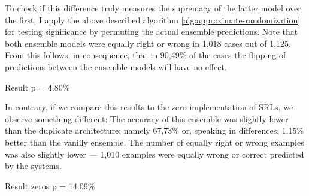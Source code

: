 To check if this difference truly measures the supremacy of the latter model over the first, I
apply the above described algorithm \ref{alg:approximate-randomization} for testing significance
by permuting the actual ensemble predictions. Note that both ensemble models were equally
right or wrong in 1,018 cases out of 1,125.  From this follows, in consequence, that in 90,49\%
of the cases the flipping of predictions between the ensemble models will have no effect.

Result p = 4.80\%

In contrary, if we compare this results to the zero implementation of SRLs, we observe something
different: The accuracy of this ensemble was slightly lower than the duplicate architecture;
namely 67,73\% or, speaking in differences, 1.15\% better than the vanilly ensemble. The
number of equally right or wrong examples was also slightly lower --- 1,010 examples were
equally wrong or correct predicted by the systems.

Result zeros p = 14.09\%


